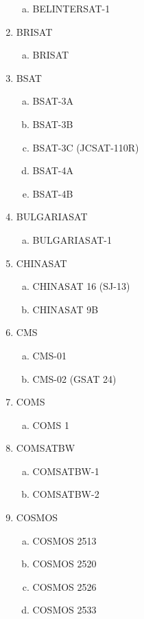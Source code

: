 \begin{multicols}{2}
\begin{enumerate}
  \begin{enumerate}[a.]
    \item BELINTERSAT-1
  \end{enumerate}
  \item BRISAT
  \begin{enumerate}[a.]
    \item BRISAT
  \end{enumerate}
  \item BSAT
  \begin{enumerate}[a.]
    \item BSAT-3A
    \item BSAT-3B
    \item BSAT-3C (JCSAT-110R)
    \item BSAT-4A
    \item BSAT-4B
  \end{enumerate}
  \item BULGARIASAT
  \begin{enumerate}[a.]
    \item BULGARIASAT-1
  \end{enumerate}
  \item CHINASAT
  \begin{enumerate}[a.]
    \item CHINASAT 16 (SJ-13)
    \item CHINASAT 9B
  \end{enumerate}
  \item CMS
  \begin{enumerate}[a.]
    \item CMS-01
    \item CMS-02 (GSAT 24)
  \end{enumerate}
  \item COMS
  \begin{enumerate}[a.]
    \item COMS 1
  \end{enumerate}
  \item COMSATBW
  \begin{enumerate}[a.]
    \item COMSATBW-1
    \item COMSATBW-2
  \end{enumerate}
  \item COSMOS
  \begin{enumerate}[a.]
    \item COSMOS 2513
    \item COSMOS 2520
    \item COSMOS 2526
    \item COSMOS 2533

\end{enumerate}
\end{enumerate}
\end{multicols}
